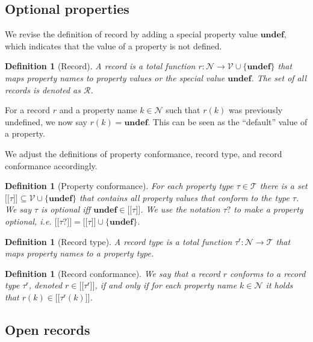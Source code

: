 \documentclass[a4paper]{article}
\newtheorem{definition}[theorem]{Definition}
\newcommand{\ptype}{\tau}
\newcommand{\ptypes}{\mathcal{T}}
\newcommand{\rtype}{\tau^\mathsf{r}}
\newcommand{\lsem}{\ensuremath{[\![}}
\newcommand{\rsem}{\ensuremath{]\!]}}
\newcommand{\sem}[1]{\ensuremath{\lsem #1 \rsem}}
\newcommand{\undefined}{\mathbf{undef}}
\begin{document}
\subsection{Optional properties}

We revise the definition of record by adding a special property value $\undefined$, which indicates that the value of a property is not defined.

\begin{definition}[Record]
  A \emph{record} is a total function $r : \mathcal{N} \to \mathcal{V} \cup \{\undefined\}$ that maps property names to property values or the special value $\undefined$. The set of all records is denoted as $\mathcal{R}$.
\end{definition}

For a record $r$ and a property name $k \in \mathcal{N}$ such that $r(k)$ was previously undefined, we now say $r(k) = \undefined$. This can be seen as the ``default'' value of a property.

We adjust the definitions of property conformance, record type, and record conformance accordingly.

\begin{definition}[Property conformance]
  For each property type $\ptype \in \ptypes$ there is a set $\sem{\ptype} \subseteq \mathcal{V} \cup \{\undefined\}$ that contains all property values that \emph{conform} to the type $\ptype$. We say $\ptype$ is \emph{optional} iff $\undefined \in \sem{\ptype}$. We use the notation $\ptype?$ to make a property optional, i.e. $\sem{\ptype?} = \sem{\ptype} \cup \{ \undefined \}$.
\end{definition}

\begin{definition}[Record type]
  A \emph{record type} is a total function $\rtype : \mathcal{N} \to \ptypes$ that maps property names to a property type.
\end{definition}

\begin{definition}[Record conformance]
  We say that a record $r$ \emph{conforms} to a record type $\rtype$, denoted $r \in \sem{\rtype}$, if and only if for each property name $k \in \mathcal{N}$ it holds that $r(k) \in \sem{\rtype(k)}$.
\end{definition}

\subsection{Open records}
\end{document}
